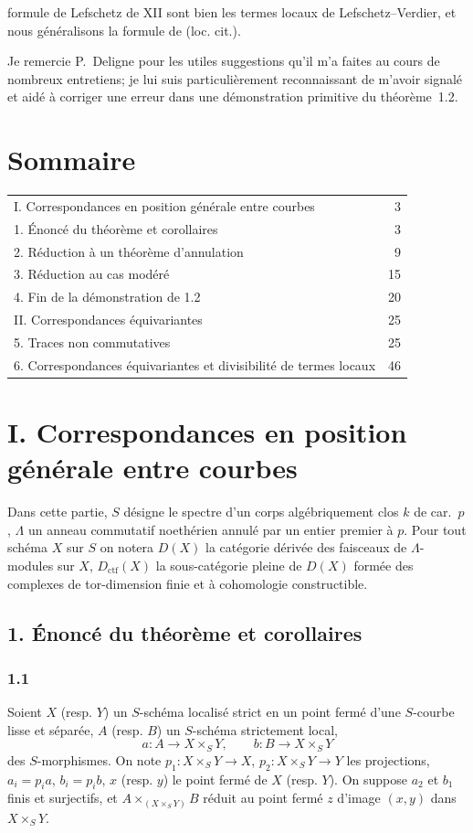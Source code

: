\documentclass[11pt]{article}
\providecommand{\ctf}{\mathrm{ctf}}
\begin{document}
formule de Lefschetz de XII sont bien les termes locaux de Lefschetz--Verdier, et nous généralisons la formule de (loc. cit.).

Je remercie P.~Deligne pour les utiles suggestions qu'il m'a faites au cours de nombreux entretiens; je lui suis particulièrement reconnaissant de m'avoir signalé et aidé à corriger une erreur dans une démonstration primitive du théorème~1.2.

\section*{Sommaire}
\begin{tabular}{@{}p{}r@{}}
I. Correspondances en position générale entre courbes & 3\\
1. Énoncé du théorème et corollaires & 3\\
2. Réduction à un théorème d'annulation & 9\\
3. Réduction au cas modéré & 15\\
4. Fin de la démonstration de 1.2 & 20\\
II. Correspondances équivariantes & 25\\
5. Traces non commutatives & 25\\
6. Correspondances équivariantes et divisibilité de termes locaux & 46
\end{tabular}

\section*{I. Correspondances en position générale entre courbes}

Dans cette partie, $S$ désigne le spectre d'un corps algébriquement clos $k$ de car.~$p$, $\Lambda$ un anneau commutatif noethérien annulé par un entier premier à $p$. Pour tout schéma $X$ sur $S$ on notera $D(X)$ la catégorie dérivée des faisceaux de $\Lambda$-modules sur $X$, $D_{\ctf}(X)$ la sous-catégorie pleine de $D(X)$ formée des complexes de tor-dimension finie et à cohomologie constructible.

\subsection*{1. Énoncé du théorème et corollaires}

\subsubsection*{1.1}
Soient $X$ (resp. $Y$) un $S$-schéma localisé strict en un point fermé d'une $S$-courbe lisse et séparée, $A$ (resp. $B$) un $S$-schéma strictement local,
\[
a:A\longrightarrow X\times_S Y,
\qquad
b:B\longrightarrow X\times_S Y
\]
des $S$-morphismes. On note $p_1:X\times_S Y\to X$, $p_2:X\times_S Y\to Y$ les projections, $a_i=p_i a$, $b_i=p_i b$, $x$ (resp. $y$) le point fermé de $X$ (resp. $Y$). On suppose $a_2$ et $b_1$ finis et surjectifs, et $A\times_{(X\times_S Y)}B$ réduit au point fermé $z$ d'image $(x,y)$ dans $X\times_S Y$.
\end{document}
